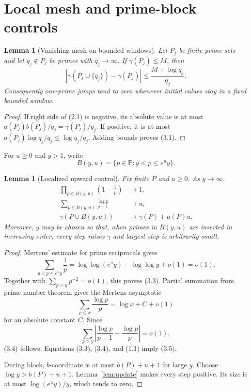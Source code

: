 \documentclass[11pt]{article}
\newtheorem{lemma}[theorem]{Lemma}
\theoremstyle{definition}
\theoremstyle{remark}
\newcommand{\PP}{\mathbb P}
\begin{document}
\section{Local mesh and prime-block controls}
\label{sec:controls}

\begin{lemma}[Vanishing mesh on bounded windows]
\label{lem:mesh}
Let $P_j$ be finite prime sets and let $q_j\notin P_j$ be primes with $q_j\to\infty$.  If
$\gamma(P_j)\leq M$, then
\begin{equation}
 \left|\gamma(P_j\cup\{q_j\})-\gamma(P_j)\right|
 \leq\frac{M+\log q_j}{q_j}.                              \tag{3.1}
\end{equation}
Consequently one-prime jumps tend to zero whenever initial values stay in a fixed bounded window.
\end{lemma}

\begin{proof}
If right side of (2.1) is negative, its absolute value is at most
$a(P_j)b(P_j)/q_j=\gamma(P_j)/q_j$.  If positive, it is at most
$a(P_j)\log q_j/q_j\leq\log q_j/q_j$.  Adding bounds proves (3.1).
\end{proof}

For $u\geq0$ and $y>1$, write
\begin{equation}
 B(y,u)=\{p\in\PP:y<p\leq e^u y\}.                        \tag{3.2}
\end{equation}

\begin{lemma}[Localized upward control]
\label{lem:up}
Fix finite $P$ and $u\geq0$.  As $y\to\infty$,
\begin{align}
 \prod_{p\in B(y,u)}\left(1-\frac1p\right)&\longrightarrow1,
                                                                    \tag{3.3}\\
 \sum_{p\in B(y,u)}\frac{\log p}{p-1}&\longrightarrow u,           \tag{3.4}\\
 \gamma(P\cup B(y,u))&\longrightarrow\gamma(P)+a(P)u.              \tag{3.5}
\end{align}
Moreover, $y$ may be chosen so that, when primes in $B(y,u)$ are inserted in increasing order,
every step raises $\gamma$ and largest step is arbitrarily small.
\end{lemma}

\begin{proof}
Mertens' estimate for prime reciprocals gives
\[
 \sum_{y<p\leq e^uy}\frac1p
 =\log\log(e^uy)-\log\log y+o(1)=o(1).
\]
Together with $\sum_{p>y}p^{-2}=o(1)$, this proves (3.3).  Partial summation from prime number
theorem gives the Mertens asymptotic
\[
 \sum_{p\leq x}\frac{\log p}{p}=\log x+C+o(1)
\]
for an absolute constant $C$.  Since
\[
 \sum_{p>y}\left|\frac{\log p}{p-1}-\frac{\log p}{p}\right|=o(1),
\]
(3.4) follows.  Equations (3.3), (3.4), and (1.1) imply (3.5).

During block, $b$-coordinate is at most $b(P)+u+1$ for large $y$.  Choose
$\log y>b(P)+u+1$.  Lemma~\ref{lem:update} makes every step positive.  Its size is at most
$\log(e^uy)/y$, which tends to zero.
\end{proof}
\end{document}
